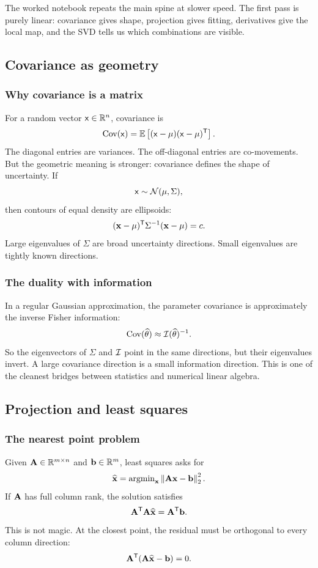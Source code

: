 \noindent
The worked notebook repeats the main spine at slower speed.  The first pass is purely linear: covariance gives shape, projection gives fitting, derivatives give the local map, and the SVD tells us which combinations are visible.

\subsection{Covariance as geometry}

\subsubsection*{Why covariance is a matrix}

For a random vector \(\mathsf{x}\in\mathbb{R}^n\), covariance is
\[
  \operatorname{Cov}(\mathsf{x})
  =
  \mathbb{E}\left[
    (\mathsf{x}-\mu)(\mathsf{x}-\mu)^{\mathsf{T}}
  \right].
\]
The diagonal entries are variances.  The off-diagonal entries are co-movements.  But the geometric meaning is stronger: covariance defines the shape of uncertainty.  If
\[
  \mathsf{x}\sim\mathcal{N}(\mu,\Sigma),
\]
then contours of equal density are ellipsoids:
\[
  (\mathbf{x}-\mu)^{\mathsf{T}}\Sigma^{-1}(\mathbf{x}-\mu)=c.
\]
Large eigenvalues of \(\Sigma\) are broad uncertainty directions.  Small eigenvalues are tightly known directions.

\subsubsection*{The duality with information}

In a regular Gaussian approximation, the parameter covariance is approximately the inverse Fisher information:
\[
  \operatorname{Cov}(\widehat{\theta})
  \approx
  \mathcal{I}(\widehat{\theta})^{-1}.
\]
So the eigenvectors of \(\Sigma\) and \(\mathcal{I}\) point in the same directions, but their eigenvalues invert.  A large covariance direction is a small information direction.  This is one of the cleanest bridges between statistics and numerical linear algebra.

\subsection{Projection and least squares}

\subsubsection*{The nearest point problem}

Given \(\mathbf{A}\in\mathbb{R}^{m\times n}\) and \(\mathbf{b}\in\mathbb{R}^m\), least squares asks for
\[
  \widehat{\mathbf{x}}
  =
  \operatorname{argmin}_{\mathbf{x}}
  \left\lVert \mathbf{A}\mathbf{x}-\mathbf{b}\right\rVert_2^2.
\]
If \(\mathbf{A}\) has full column rank, the solution satisfies
\[
  \mathbf{A}^{\mathsf{T}}\mathbf{A}\widehat{\mathbf{x}}
  =
  \mathbf{A}^{\mathsf{T}}\mathbf{b}.
\]
This is not magic.  At the closest point, the residual must be orthogonal to every column direction:
\[
  \mathbf{A}^{\mathsf{T}}(\mathbf{A}\widehat{\mathbf{x}}-\mathbf{b})=0.
\]

